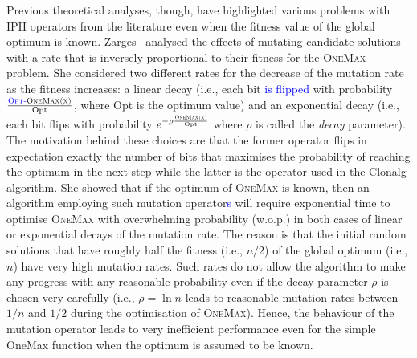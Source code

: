 \documentclass[lettersize,journal]{IEEEtran}
\newcommand{\new}[1]{\textcolor{blue}{#1}}
\begin{document}
Previous theoretical analyses, though, have highlighted various problems with %
IPH operators from the literature even when the fitness value of the global optimum is known.
Zarges~ \cite{Zarges2008} analysed the effects of mutating candidate solutions with a rate that is inversely proportional to their fitness for the \textsc{OneMax} problem.
She considered two different rates for the decrease of the mutation rate as the fitness increases: a linear decay (i.e., each bit \new{is flipped} with probability $\frac{\textsc{{\color{blue}\text{Opt}-}OneMax(x)}}{\text{Opt}}$, where Opt is the optimum value) 
and an exponential decay (i.e., each bit flips with probability $e^{- \rho \frac{\textsc{OneMax(x)}}{\text{Opt}}}$ where $\rho$ is called the {\it decay} parameter).
The motivation behind these choices are that the former operator flips in expectation exactly the number of bits that maximises the probability of reaching the optimum in the next step while the latter is the
operator used in the Clonalg algorithm.  
She showed that if the optimum of \textsc{OneMax} is known, then an algorithm employing such mutation operator\new{s} will require exponential time to optimise \textsc{OneMax} with overwhelming probability (w.o.p.)
in both cases of linear or exponential decays of the mutation rate.
The reason is that the initial random solutions that have roughly half the fitness (i.e., $n/2$) of the global optimum (i.e., $n$) have very high mutation rates. Such rates do not allow the algorithm to make any progress with any reasonable probability even if the decay parameter $\rho$ is chosen very carefully (i.e., $\rho = \ln n$ leads to reasonable mutation rates between $1/n$ and $1/2$ %
during the optimisation of \textsc{OneMax}).
Hence, the behaviour of the mutation operator leads to very inefficient performance even for the simple OneMax function when the optimum is assumed to be known. 
\end{document}
